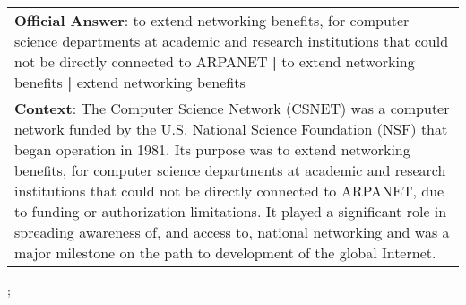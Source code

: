 \begin{figure*}[ht]
{\begin{tabular}{p{}}
            \textbf{Official Answer}: to extend networking benefits, for computer science departments at academic and research institutions that could not be directly connected to ARPANET \textbf{|} to extend networking benefits \textbf{|} extend networking benefits                                                                                                                                                                                                                                                                                               \\
            \textbf{Context}: The Computer Science Network (CSNET) was a computer network funded by the U.S. National Science Foundation (NSF) that began operation in 1981. Its purpose was to extend networking benefits, for computer science departments at academic and research institutions that could not be directly connected to ARPANET, due to funding or authorization limitations. It played a significant role in spreading awareness of, and access to, national networking and was a major milestone on the path to development of the global Internet. \\
        \end{tabular}
    };
    \label{fig:ex-5726462b708984140094c118}
\end{figure*}

